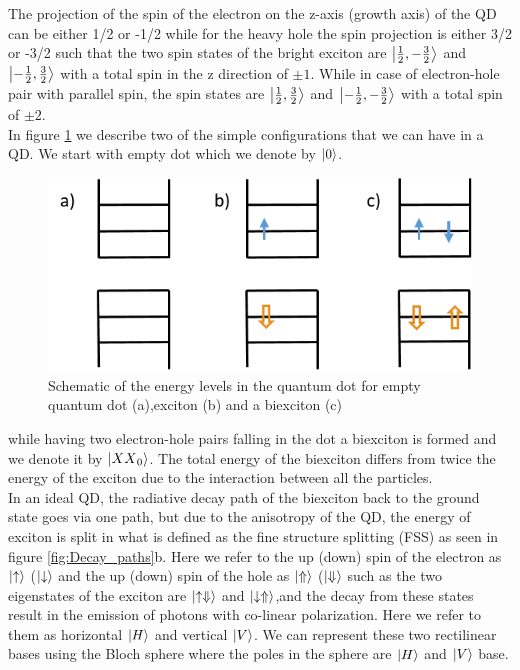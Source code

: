 The projection of the spin of the electron on the z-axis (growth axis) of the QD can be either 1/2 or -1/2 while for the heavy hole the spin projection is either 3/2 or -3/2 such that the two spin states of the bright exciton are $\ket{\frac{1}{2},-\frac{3}{2}}$ and $\ket{-\frac{1}{2},\frac{3}{2}}$  with a total spin in the z direction  of $\pm1$. While in case of electron-hole pair with parallel spin, the spin states are $\ket{\frac{1}{2},\frac{3}{2}}$ and $\ket{-\frac{1}{2},-\frac{3}{2}}$ with a total spin of $\pm2$.\\
In figure \ref{fig:energy_levels} we describe two of the simple configurations that we can have in a QD. We start with empty dot which we denote by $\ket{0}$.
\begin{figure}[H]
	\centering
	\includegraphics[scale=1]{figures/energy-levels.png}
	\caption{Schematic of the energy levels in the quantum dot for empty quantum dot (a),exciton (b) and a biexciton (c)}
	\label{fig:energy_levels}
\end{figure}

while having two electron-hole pairs falling in the dot a biexciton is formed and we denote it by $\ket{{XX}_0}$. The total energy of the biexciton differs from twice the energy of the exciton due to the interaction between all the particles.\\

In an ideal QD, the radiative decay path of the biexciton back to the ground state goes via one path, but due to the anisotropy of the QD, the energy of exciton is split in what is defined as the fine structure splitting (FSS) as seen in figure \ref{fig:Decay_paths}b. Here we refer to the up (down) spin of the electron as $\ket{\uparrow}$ ($\ket{\downarrow}$ and the up (down) spin of the hole as $\ket{\Uparrow}$ ($\ket{\Downarrow}$ such as the two eigenstates of the exciton are  $\ket{\uparrow\Downarrow}$ and $\ket{\downarrow\Uparrow}$,and the decay from these states result in the emission of photons with co-linear polarization. Here we refer to them as horizontal $\ket{H}$ and vertical $\ket{V}$. We can represent these two rectilinear bases using the Bloch sphere where the poles in the sphere are $\ket{H}$ and $\ket{V}$ base.\\

